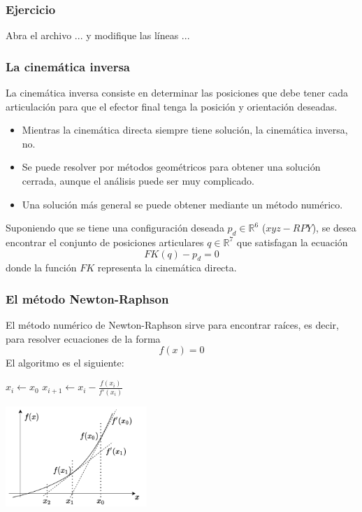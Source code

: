 \begin{frame}\frametitle{Ejercicio}
  Abra el archivo ... y modifique las líneas ...
\end{frame}

\begin{frame}\frametitle{La cinemática inversa}
  La cinemática inversa consiste en determinar las posiciones que debe tener cada articulación para que el efector final tenga la posición y orientación deseadas.
  \begin{itemize}
  \item Mientras la cinemática directa siempre tiene solución, la cinemática inversa, no.
  \item Se puede resolver por métodos geométricos para obtener una solución cerrada, aunque el análisis puede ser muy complicado.
  \item Una solución más general se puede obtener mediante un método numérico. 
  \end{itemize}
  Suponiendo que se tiene una configuración deseada $p_d \in \mathbb{R}^6$ ($xyz-RPY$), se desea encontrar el conjunto de posiciones articulares $q\in\mathbb{R}^7$ que satisfagan la ecuación
  \[FK(q) - p_d = 0\]
  donde la función $FK$ representa la cinemática directa. 
\end{frame}

\begin{frame}\frametitle{El método Newton-Raphson}
  El método numérico de Newton-Raphson sirve para encontrar raíces, es decir, para resolver ecuaciones de la forma
  \[f(x) = 0\]
  El algoritmo es el siguiente:
  \[\]
  \begin{multicols}{2}
  \begin{algorithm}[H]
    \DontPrintSemicolon
    $x_i \leftarrow x_0$\;
    {
       $x_{i+1} \leftarrow x_i - \frac{f(x_i)}{f'(x_i)}$
    }
  \end{algorithm}
  \includegraphics[width=0.4\textwidth]{Figures/NewtonRaphson.pdf}
  \end{multicols}
\end{frame}

